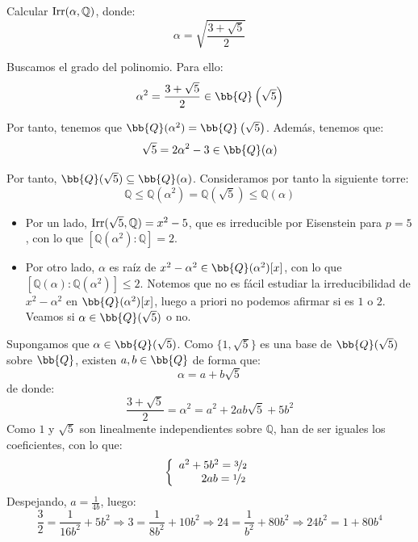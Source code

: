 \begin{ejercicio}
    Calcular $\operatorname{Irr}(\alpha,\mathbb{Q})$, donde:
    \begin{equation*}
        \alpha = \sqrt{\frac{3+\sqrt{5}}{2}}
    \end{equation*}

    Buscamos el grado del polinomio. Para ello:
    \begin{equation*}
        \alpha^2 = \frac{3+\sqrt{5}}{2}\in \bb{Q}\left(\sqrt{5}\right)
    \end{equation*}

    Por tanto, tenemos que $\bb{Q}(\alpha^2) = \bb{Q}\left(\sqrt{5}\right)$. Además, tenemos que:
    \begin{equation*}
        \sqrt{5} = 2\alpha^2 - 3 \in \bb{Q}(\alpha)
    \end{equation*}

    Por tanto, $\bb{Q}(\sqrt{5}) \subseteq \bb{Q}(\alpha)$. Consideramos por tanto la siguiente torre:
    \begin{equation*}
        \mathbb{Q} \leq \mathbb{Q}(\alpha^2) = \mathbb{Q}\left(\sqrt{5}\right) \leq \mathbb{Q}(\alpha)
    \end{equation*}
    \begin{itemize}
        \item Por un lado, $\operatorname{Irr}(\sqrt{5},\mathbb{Q}) = x^2-5$, que es irreducible por Eisenstein para $p=5$, con lo que $[\mathbb{Q}(\alpha^2):\mathbb{Q}] = 2$.
        \item Por otro lado, $\alpha$ es raíz de $x^2-\alpha^2\in \bb{Q}(\alpha^2)[x]$, con lo que $[\mathbb{Q}(\alpha):\mathbb{Q}(\alpha^2)] \leq 2$. Notemos que no es fácil estudiar la irreducibilidad de $x^2-\alpha^2$ en $\bb{Q}(\alpha^2)[x]$, luego a priori no podemos afirmar si es $1$ o $2$. Veamos si $\alpha\in \bb{Q}(\sqrt{5})$ o no.
    \end{itemize}

    Supongamos que $\alpha\in \bb{Q}(\sqrt{5})$. Como $\{1,\sqrt{5}\}$ es una base de $\bb{Q}(\sqrt{5})$ sobre $\bb{Q}$, existen $a,b\in \bb{Q}$ de forma que:
    \begin{equation*}
        \alpha = a + b\sqrt{5}
    \end{equation*}
    de donde:
    \begin{equation*}
        \frac{3+\sqrt{5}}{2} = \alpha^2 = a^2 + 2ab\sqrt{5} + 5b^2
    \end{equation*}
    Como $1$ y $\sqrt{5}$ son linealmente independientes sobre $\mathbb{Q}$, han de ser iguales los coeficientes, con lo que:
    \begin{equation*}
        \left\{\begin{array}{l}
            a^2 + 5b^2 = \nicefrac{3}{2}\\ \qquad 2ab = \nicefrac{1}{2} 
        \end{array}\right.
    \end{equation*}
    Despejando, $a = \frac{1}{4b}$, luego:
    \begin{equation*}
        \frac{3}{2} = \frac{1}{16b^2} + 5b^2 \Longrightarrow 3 = \frac{1}{8b^2} + 10b^2 \Longrightarrow 24 = \frac{1}{b^2} + 80b^2 \Longrightarrow 24b^2 = 1 + 80b^4
    \end{equation*}


\end{ejercicio}
